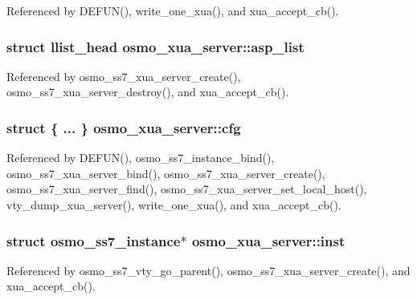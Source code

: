 Referenced by D\+E\+F\+U\+N(), write\+\_\+one\+\_\+xua(), and xua\+\_\+accept\+\_\+cb().

\subsubsection[{asp\+\_\+list}]{\setlength{\rightskip}{0pt plus 5cm}struct llist\+\_\+head osmo\+\_\+xua\+\_\+server\+::asp\+\_\+list}\label{structosmo__xua__server_a5624439338814a877c66b36a82e247f4}


Referenced by osmo\+\_\+ss7\+\_\+xua\+\_\+server\+\_\+create(), osmo\+\_\+ss7\+\_\+xua\+\_\+server\+\_\+destroy(), and xua\+\_\+accept\+\_\+cb().

\subsubsection[{cfg}]{\setlength{\rightskip}{0pt plus 5cm}struct \{ ... \}   osmo\+\_\+xua\+\_\+server\+::cfg}\label{structosmo__xua__server_a848a8f97849ad45fd0bab0f6a1b986a2}


Referenced by D\+E\+F\+U\+N(), osmo\+\_\+ss7\+\_\+instance\+\_\+bind(), osmo\+\_\+ss7\+\_\+xua\+\_\+server\+\_\+bind(), osmo\+\_\+ss7\+\_\+xua\+\_\+server\+\_\+create(), osmo\+\_\+ss7\+\_\+xua\+\_\+server\+\_\+find(), osmo\+\_\+ss7\+\_\+xua\+\_\+server\+\_\+set\+\_\+local\+\_\+host(), vty\+\_\+dump\+\_\+xua\+\_\+server(), write\+\_\+one\+\_\+xua(), and xua\+\_\+accept\+\_\+cb().

\subsubsection[{inst}]{\setlength{\rightskip}{0pt plus 5cm}struct {\bf osmo\+\_\+ss7\+\_\+instance}$\ast$ osmo\+\_\+xua\+\_\+server\+::inst}\label{structosmo__xua__server_a2ddea103730f2733d6acd1370eb8bec9}


Referenced by osmo\+\_\+ss7\+\_\+vty\+\_\+go\+\_\+parent(), osmo\+\_\+ss7\+\_\+xua\+\_\+server\+\_\+create(), and xua\+\_\+accept\+\_\+cb().


